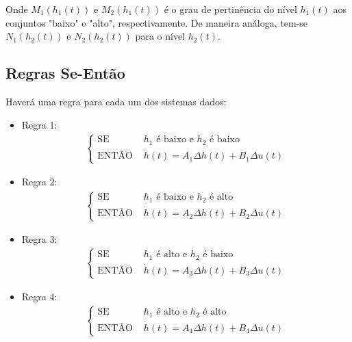 Onde $M_1(h_1(t))$ e $M_2(h_1(t))$ é o grau de pertinência do nível $h_1(t)$ aos conjuntos "baixo" e "alto", respectivamente. De maneira análoga, tem-se $N_1(h_2(t))$ e $N_2(h_2(t))$ para o nível $h_2(t)$.

\subsection{Regras Se-Então}
Haverá uma regra para cada um dos sistemas dados:

	\begin{itemize}
		\item Regra 1:\\ 
		\begin{align*}
			\begin{cases}
				\text{SE } &h_1 \text{ é baixo e } h_2 \text{ é baixo} \\
				\text{ENTÃO } &\dot{h}(t) =  A_1 \Delta h(t) +  B_1 \Delta u(t)
			\end{cases}		
		\end{align*}

		\item Regra 2:\\ 
		\begin{align*}
		\begin{cases}
			\text{SE } &h_1 \text{ é baixo e } h_2 \text{ é alto} \\
			\text{ENTÃO } &\dot{h}(t) =  A_2 \Delta h(t) +  B_2 \Delta u(t)
		\end{cases}		
		\end{align*}

		\item Regra 3:\\ 
		\begin{align*}
		\begin{cases}
			\text{SE } &h_1 \text{ é alto e } h_2 \text{ é baixo} \\
			\text{ENTÃO } &\dot{h}(t) =  A_3 \Delta h(t) +  B_3 \Delta u(t)
		\end{cases}		
		\end{align*}

		\item Regra 4:\\ 
		\begin{align*}
		\begin{cases}
			\text{SE } &h_1 \text{ é alto e } h_2 \text{ é alto} \\
			\text{ENTÃO } &\dot{h}(t) =  A_4 \Delta h(t) +  B_4 \Delta u(t)
		\end{cases}		
		\end{align*}
	\end{itemize}

